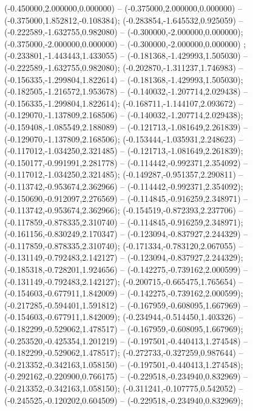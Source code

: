  (-0.450000,2.000000,0.000000) -- (-0.375000,2.000000,0.000000) -- (-0.375000,1.852812,-0.108384);
 (-0.283854,-1.645532,0.925059) -- (-0.222589,-1.632755,0.982080) -- (-0.300000,-2.000000,0.000000);
 (-0.375000,-2.000000,0.000000) -- (-0.300000,-2.000000,0.000000) ;
 (-0.233801,-1.443443,1.433055) -- (-0.181368,-1.429993,1.505030) -- (-0.222589,-1.632755,0.982080);
 (-0.202870,-1.311237,1.746983) -- (-0.156335,-1.299804,1.822614) -- (-0.181368,-1.429993,1.505030);
 (-0.182505,-1.216572,1.953678) -- (-0.140032,-1.207714,2.029438) -- (-0.156335,-1.299804,1.822614);
 (-0.168711,-1.144107,2.093672) -- (-0.129070,-1.137809,2.168506) -- (-0.140032,-1.207714,2.029438);
 (-0.159408,-1.085549,2.188089) -- (-0.121713,-1.081649,2.261839) -- (-0.129070,-1.137809,2.168506);
 (-0.153444,-1.035931,2.248623) -- (-0.117012,-1.034250,2.321485) -- (-0.121713,-1.081649,2.261839);
 (-0.150177,-0.991991,2.281778) -- (-0.114442,-0.992371,2.354092) -- (-0.117012,-1.034250,2.321485);
 (-0.149287,-0.951357,2.290811) -- (-0.113742,-0.953674,2.362966) -- (-0.114442,-0.992371,2.354092);
 (-0.150690,-0.912097,2.276569) -- (-0.114845,-0.916259,2.348971) -- (-0.113742,-0.953674,2.362966);
 (-0.154519,-0.872393,2.237706) -- (-0.117859,-0.878335,2.310740) -- (-0.114845,-0.916259,2.348971);
 (-0.161156,-0.830249,2.170347) -- (-0.123094,-0.837927,2.244329) -- (-0.117859,-0.878335,2.310740);
 (-0.171334,-0.783120,2.067055) -- (-0.131149,-0.792483,2.142127) -- (-0.123094,-0.837927,2.244329);
 (-0.185318,-0.728201,1.924656) -- (-0.142275,-0.739162,2.000599) -- (-0.131149,-0.792483,2.142127);
 (-0.200715,-0.665475,1.765654) -- (-0.154603,-0.677911,1.842009) -- (-0.142275,-0.739162,2.000599);
 (-0.217285,-0.594401,1.591812) -- (-0.167959,-0.608095,1.667969) -- (-0.154603,-0.677911,1.842009);
 (-0.234944,-0.514450,1.403326) -- (-0.182299,-0.529062,1.478517) -- (-0.167959,-0.608095,1.667969);
 (-0.253520,-0.425354,1.201219) -- (-0.197501,-0.440413,1.274548) -- (-0.182299,-0.529062,1.478517);
 (-0.272733,-0.327259,0.987644) -- (-0.213352,-0.342163,1.058150) -- (-0.197501,-0.440413,1.274548);
 (-0.292162,-0.220900,0.766175) -- (-0.229518,-0.234940,0.832969) -- (-0.213352,-0.342163,1.058150);
 (-0.311241,-0.107775,0.542052) -- (-0.245525,-0.120202,0.604509) -- (-0.229518,-0.234940,0.832969);

